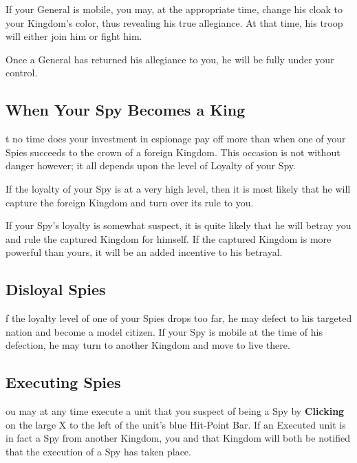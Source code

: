 If your General is mobile, you may, at the appropriate time, change his cloak to your Kingdom’s color, thus revealing his true allegiance. At that time, his troop will either join him or fight him.

Once a General has returned his allegiance to you, he will be fully under your control.

\subsection{When Your Spy Becomes a King}


t no time does your investment in espionage pay off more than when one of your Spies succeeds to the crown of a foreign Kingdom. This occasion is not without danger however; it all depends upon the level of Loyalty of your Spy.

If the loyalty of your Spy is at a very high level, then it is most likely that he will capture the foreign Kingdom and turn over its rule to you.

If your Spy’s loyalty is somewhat suspect, it is quite likely that he will betray you and rule the captured Kingdom for himself. If the captured Kingdom is more powerful than yours, it will be an added incentive to his betrayal.

\subsection{Disloyal Spies}


f the loyalty level of one of your Spies drops too far, he may defect to his targeted nation and become a model citizen. If your Spy is mobile at the time of his defection, he may turn to another Kingdom and move to live there.

\subsection{Executing Spies}


ou may at any time execute a unit that you suspect of being a Spy by \textbf{Clicking} on the large X to the left of the unit’s blue Hit-Point Bar. If an Executed unit is in fact a Spy from another Kingdom, you and that Kingdom will both be notified that the execution of a Spy has taken place.

